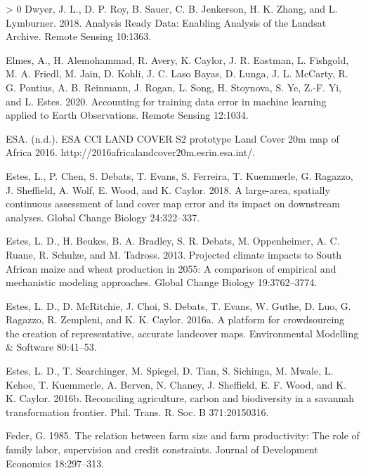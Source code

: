 \documentclass[11pt,a4paper]{article}
\newlength{\cslhangindent}
\newenvironment{CSLReferences}[3] %
 {%
  \setlength{\parindent}{0pt}
  \ifodd #1 \everypar{\setlength{\hangindent}{\cslhangindent}}\ignorespaces\fi
  \ifnum #2 > 0
  \setlength{\parskip}{#2\baselineskip}
  \fi
 }%
 {}
\begin{document}
\begin{CSLReferences}{1}{0}
\leavevmode\hypertarget{ref-DwyerAnalysisReadyData2018}{}%
Dwyer, J. L., D. P. Roy, B. Sauer, C. B. Jenkerson, H. K. Zhang, and L.
Lymburner. 2018. Analysis {Ready Data}: Enabling {Analysis} of the
{Landsat Archive}. Remote Sensing 10:1363.

\leavevmode\hypertarget{ref-ElmesAccountingtrainingdata2020}{}%
Elmes, A., H. Alemohammad, R. Avery, K. Caylor, J. R. Eastman, L.
Fishgold, M. A. Friedl, M. Jain, D. Kohli, J. C. Laso Bayas, D. Lunga,
J. L. McCarty, R. G. Pontius, A. B. Reinmann, J. Rogan, L. Song, H.
Stoynova, S. Ye, Z.-F. Yi, and L. Estes. 2020. Accounting for training
data error in machine learning applied to {Earth Observations}. Remote
Sensing 12:1034.

\leavevmode\hypertarget{ref-ESAESACCILAND}{}%
ESA. (n.d.). {ESA CCI LAND COVER} {} {S2} prototype {Land Cover} 20m map
of {Africa} 2016. http://2016africalandcover20m.esrin.esa.int/.

\leavevmode\hypertarget{ref-Esteslargeareaspatiallycontinuous2018}{}%
Estes, L., P. Chen, S. Debats, T. Evans, S. Ferreira, T. Kuemmerle, G.
Ragazzo, J. Sheffield, A. Wolf, E. Wood, and K. Caylor. 2018. A
large-area, spatially continuous assessment of land cover map error and
its impact on downstream analyses. Global Change Biology 24:322--337.

\leavevmode\hypertarget{ref-EstesProjectedclimateimpacts2013}{}%
Estes, L. D., H. Beukes, B. A. Bradley, S. R. Debats, M. Oppenheimer, A.
C. Ruane, R. Schulze, and M. Tadross. 2013. Projected climate impacts to
{South African} maize and wheat production in 2055: A comparison of
empirical and mechanistic modeling approaches. Global Change Biology
19:3762--3774.

\leavevmode\hypertarget{ref-Estesplatformcrowdsourcingcreation2016}{}%
Estes, L. D., D. McRitchie, J. Choi, S. Debats, T. Evans, W. Guthe, D.
Luo, G. Ragazzo, R. Zempleni, and K. K. Caylor. 2016a. A platform for
crowdsourcing the creation of representative, accurate landcover maps.
Environmental Modelling \& Software 80:41--53.

\leavevmode\hypertarget{ref-EstesReconcilingagriculturecarbon2016}{}%
Estes, L. D., T. Searchinger, M. Spiegel, D. Tian, S. Sichinga, M.
Mwale, L. Kehoe, T. Kuemmerle, A. Berven, N. Chaney, J. Sheffield, E. F.
Wood, and K. K. Caylor. 2016b. Reconciling agriculture, carbon and
biodiversity in a savannah transformation frontier. Phil. Trans. R. Soc.
B 371:20150316.

\leavevmode\hypertarget{ref-federRelationFarmSize1985}{}%
Feder, G. 1985. The relation between farm size and farm productivity:
The role of family labor, supervision and credit constraints. Journal of
Development Economics 18:297--313.


\end{CSLReferences}
\end{document}
